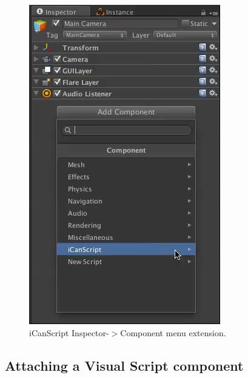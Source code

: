 \begin{figure}[htbp]
\centering
\includegraphics[keepaspectratio,width=\textwidth,height=0.75\textheight]{menu-component2.png}
\caption{iCanScript Inspector-$>$Component menu extension.}
\label{menu-component2.png}
\end{figure}

\subsection{Attaching a Visual Script component}
\label{attachingavisualscriptcomponent}

